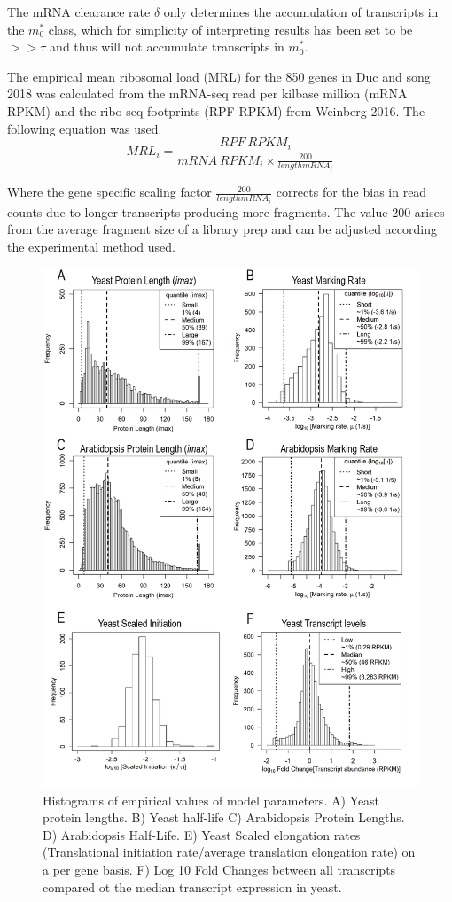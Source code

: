 \documentclass[review]{elsarticle}
\begin{document}
The mRNA clearance rate $\delta$ only determines the accumulation of transcripts in the  $m_0^*$  class, which for simplicity of interpreting results has been set to be $>>\tau$ and thus will not accumulate transcripts in $m_0^*$.
 
The empirical mean ribosomal load (MRL) for the 850 genes in Duc and song 2018 was calculated from the mRNA-seq read per kilbase million (mRNA RPKM) and the ribo-seq footprints (RPF RPKM) from Weinberg 2016. The following equation was used.
\begin{equation}\label{eq:MRL}
	MRL_i = \frac{RPF\: RPKM_i}{mRNA\: RPKM_i \times \frac{200}{length mRNA_i}}
\end{equation}

Where the gene specific scaling factor $\frac{200}{length mRNA_i}$ corrects for the bias in read counts due to longer transcripts producing more fragments. The value 200 arises from the average fragment size of a library prep and can be adjusted according the experimental method used.

\begin{figure}[!ht]
\centering
\includegraphics[width=120mm]{Images/2023-07-04_parameter_histograms.png}
\caption{Histograms of empirical values of model parameters. A) Yeast protein lengths. B) Yeast half-life C) Arabidopsis Protein Lengths. D) Arabidopsis Half-Life. E) Yeast Scaled elongation rates (Translational initiation rate/average translation elongation rate) on a per gene basis. F) Log 10 Fold Changes between all transcripts compared ot the median transcript expression in yeast. }
\end{figure}
\clearpage		
\end{document}
